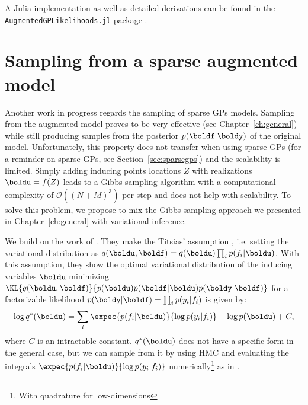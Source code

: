 A Julia implementation as well as detailed derivations can be found in the \href{https://github.com/JuliaGaussianProcesses/AugmentedGPLikelihoods.jl}{\texttt{AugmentedGPLikelihoods.jl}} package \cite{theo_galy_fajou_2022_6347022}.

\section{Sampling from a sparse augmented model}
\label{sec:sample_sparse}
Another work in progress regards the sampling of sparse \acp{GP} models.
Sampling from the augmented model proves to be very effective (see Chapter~\ref{ch:general}) while still producing samples from the posterior $p(\boldf|\boldy)$ of the original model.
Unfortunately, this property does not transfer when using sparse \acp{GP} (for a reminder on sparse \acp{GP}, see Section~\ref{sec:sparsegps}) and the scalability is limited.
Simply adding inducing points locations $Z$ with realizations $\boldu = f(Z)$ leads to a Gibbs sampling algorithm with a computational complexity of $\mathcal{O}((N+M)^3)$ per step and does not help with scalability.
To solve this problem, we propose to mix the Gibbs sampling approach we presented in Chapter~\ref{ch:general} with variational inference.

We build on the work of \citet{hensmanMCMCVariationallySparse2015}. 
They make the Titsias' assumption \cite{Titsias2009}, i.e. setting the variational distribution as $q(\boldu,\boldf) = q(\boldu)\prod_i p(f_i|\boldu)$.
With this assumption, they show the optimal variational distribution of the inducing variables $\boldu$ minimizing $\KL{q(\boldu, \boldf)}{p(\boldu)p(\boldf|\boldu)p(\boldy|\boldf)}$ for a factorizable likelihood $p(\boldy|\boldf)=\prod_i p(y_i|f_i)$ is given by:
\begin{align}
    \log q^*(\boldu) = \sum_{i}\expec{p(f_i|\boldu)}{\log p(y_i|f_i)} + \log p(\boldu) + C,\label{eq:obj_hensman}
\end{align}
where $C$ is an intractable constant.
$q^*(\boldu)$ does not have a specific form in the general case, but we can sample from it by using \ac{HMC} and evaluating the integrals $\expec{p(f_i|\boldu)}{\log p(y_i|f_i)}$ numerically\footnote{With quadrature for low-dimensions} as in \cite{hensmanMCMCVariationallySparse2015}.

